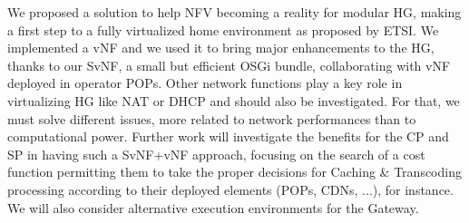 We proposed a solution to help NFV becoming a reality for modular HG, making a first step to a fully virtualized home environment as proposed by ETSI.
We implemented a vNF and we used it to bring major enhancements to the HG, thanks to our SvNF, a small but efficient OSGi bundle, collaborating with vNF deployed in operator POPs.
Other network functions play a key role in virtualizing HG like NAT or DHCP and should also be investigated.
For that, we must solve different issues, more related to network performances than to computational power. 
Further work will investigate the benefits for the CP and SP in having such a SvNF+vNF approach, focusing on the search of a cost function permitting them to take the proper decisions for Caching \& Transcoding processing according to their deployed elements (POPs, CDNs, ...), for instance. 
We will also consider alternative execution environments for the Gateway.


